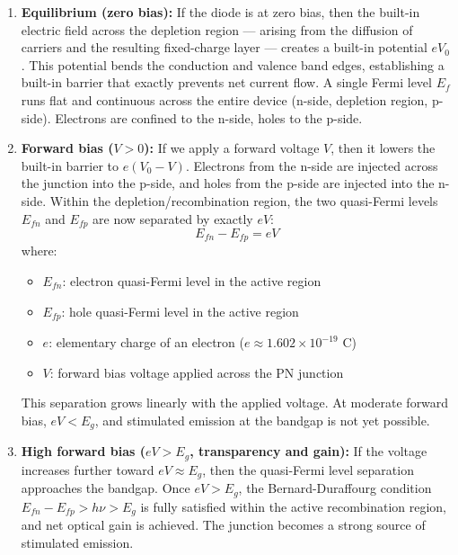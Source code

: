 \begin{enumerate}
    \item \textbf{Equilibrium (zero bias):} If the diode is at zero bias, then the built-in electric field across the depletion region — arising from the diffusion of carriers and the resulting fixed-charge layer — creates a built-in potential $eV_0$. This potential bends the conduction and valence band edges, establishing a built-in barrier that exactly prevents net current flow. A single Fermi level $E_f$ runs flat and continuous across the entire device (n-side, depletion region, p-side). Electrons are confined to the n-side, holes to the p-side.

    \item \textbf{Forward bias ($V > 0$):} If we apply a forward voltage $V$, then it lowers the built-in barrier to $e(V_0 - V)$. Electrons from the n-side are injected across the junction into the p-side, and holes from the p-side are injected into the n-side. Within the depletion/recombination region, the two quasi-Fermi levels $E_{fn}$ and $E_{fp}$ are now separated by exactly $eV$:
          \begin{equation*}
              E_{fn} - E_{fp} = eV
          \end{equation*}
          where:
          \begin{itemize}
              \item $E_{fn}$: electron quasi-Fermi level in the active region
              \item $E_{fp}$: hole quasi-Fermi level in the active region
              \item $e$: elementary charge of an electron ($e \approx 1.602 \times 10^{-19}\text{ C}$)
              \item $V$: forward bias voltage applied across the PN junction
          \end{itemize}
          This separation grows linearly with the applied voltage. At moderate forward bias, $eV < E_g$, and stimulated emission at the bandgap is not yet possible.

    \item \textbf{High forward bias ($eV > E_g$, transparency and gain):} If the voltage increases further toward $eV \approx E_g$, then the quasi-Fermi level separation approaches the bandgap. Once $eV > E_g$, the Bernard-Duraffourg condition $E_{fn} - E_{fp} > h\nu > E_g$ is fully satisfied within the active recombination region, and net optical gain is achieved. The junction becomes a strong source of stimulated emission.
\end{enumerate}


